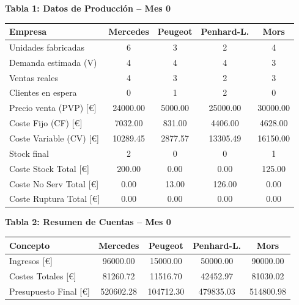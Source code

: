 \documentclass{standalone}
\begin{document}
	\leavevmode %
	
	\begin{minipage}{1.08\linewidth}
		\centering
		
		\textbf{Tabla 1: Datos de Producción – Mes 0}\\[0.5em]
		\begin{tabular}{@{}l
				S[table-format=2.0]
				S[table-format=2.0]
				S[table-format=2.0]
				S[table-format=2.0]@{}}
			\toprule
			\textbf{Empresa} & \textbf{Mercedes} & \textbf{Peugeot} & \textbf{Penhard-L.} & \textbf{Mors} \\
			\midrule
			Unidades fabricadas & 6 & 3 & 2 & 4 \\
			Demanda estimada (V) & 4 & 4 & 4 & 3 \\
			Ventas reales & 4 & 3 & 2 & 3 \\
			Clientes en espera & 0 & 1 & 2 & 0 \\
			Precio venta (PVP) [\euro] & 24000.00 & 5000.00 & 25000.00 & 30000.00 \\
			Coste Fijo (CF) [\euro] & 7032.00 & 831.00 & 4406.00 & 4628.00 \\
			Coste Variable (CV) [\euro] & 10289.45 & 2877.57 & 13305.49 & 16150.00 \\
			Stock final & 2 & 0 & 0 & 1 \\
			Coste Stock Total [\euro] & 200.00 & 0.00 & 0.00 & 125.00 \\
			Coste No Serv Total [\euro] & 0.00 & 13.00 & 126.00 & 0.00 \\
			Coste Ruptura Total [\euro] & 0.00 & 0.00 & 0.00 & 0.00 \\
			\bottomrule
		\end{tabular}
		
		\vspace{2em} %
		
		\textbf{Tabla 2: Resumen de Cuentas – Mes 0}\\[0.5em]
		\begin{tabular}{@{}l
				S[table-format=7.2]
				S[table-format=7.2]
				S[table-format=7.2]
				S[table-format=7.2]@{}}
			\toprule
			\textbf{Concepto} & \textbf{Mercedes} & \textbf{Peugeot} & \textbf{Penhard-L.} & \textbf{Mors} \\
			\midrule
			Ingresos [\euro] & 96000.00 & 15000.00 & 50000.00 & 90000.00 \\
			Costes Totales [\euro] & 81260.72 & 11516.70 & 42452.97 & 81030.02 \\
			Presupuesto Final [\euro] & 520602.28 & 104712.30 & 479835.03 & 514800.98 \\
			\bottomrule
		\end{tabular}
		
	\end{minipage}
\end{document}
